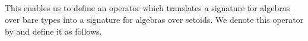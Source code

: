 \begin{code}%
\>[0]\<%
\\
\>[0]\AgdaSpace{}%
\AgdaSymbol{:}%
\>[10]\AgdaSymbol{\{}\AgdaSpace{}%
\AgdaSymbol{:}\AgdaSpace{}%
\AgdaSpace{}%
\AgdaSpace{}%
\AgdaSymbol{\}\{}\AgdaSpace{}%
\AgdaSymbol{:}\AgdaSpace{}%
\AgdaSpace{}%
\AgdaSpace{}%
\AgdaSymbol{\}}\<%
\\
\>[0][@{}l@{\AgdaIndent{0}}]%
\>[1]%
\>[10]\AgdaSpace{}%
\AgdaSymbol{\{}\AgdaSpace{}%
\AgdaSymbol{\}}\AgdaSpace{}%
\AgdaSpace{}%
\AgdaSpace{}%
\AgdaSpace{}%
\AgdaSpace{}%
\AgdaSpace{}%
\AgdaSymbol{(}\AgdaSpace{}%
\AgdaSpace{}%
\AgdaSpace{}%
\AgdaSpace{}%
\AgdaSpace{}%
\AgdaSpace{}%
\AgdaSymbol{)}\AgdaSpace{}%
\AgdaSpace{}%
\AgdaSymbol{(}\AgdaSpace{}%
\AgdaSpace{}%
\AgdaSpace{}%
\AgdaSpace{}%
\AgdaSpace{}%
\AgdaSpace{}%
\AgdaSymbol{)}\AgdaSpace{}%
\AgdaSpace{}%
\AgdaSpace{}%
\AgdaSymbol{(}\AgdaSpace{}%
\AgdaSpace{}%
\AgdaSymbol{)}\<%
\\
\>[0]\AgdaSpace{}%
\AgdaSymbol{\{}\AgdaSpace{}%
\AgdaSymbol{=}\AgdaSpace{}%
\AgdaSymbol{\}}\AgdaSpace{}%
\AgdaSpace{}%
\AgdaSpace{}%
\AgdaSpace{}%
\AgdaSymbol{=}\AgdaSpace{}%
\AgdaSpace{}%
\AgdaSpace{}%
\AgdaSpace{}%
\AgdaSpace{}%
\AgdaSpace{}%
\AgdaSpace{}%
\AgdaSpace{}%
\AgdaSpace{}%
\AgdaSpace{}%
\AgdaSpace{}%
\AgdaSpace{}%
\AgdaSpace{}%
\AgdaSpace{}%
\AgdaSymbol{(}\AgdaSpace{}%
\AgdaSpace{}%
\AgdaSymbol{)}\<%
\\
\>[0]\<%
\end{code}
\noindent
This enables us to define an operator which translates a signature for algebras over bare types into a signature for algebras over setoids.
\ifshort\else
We denote this operator by  and define it as follows.
\fi

